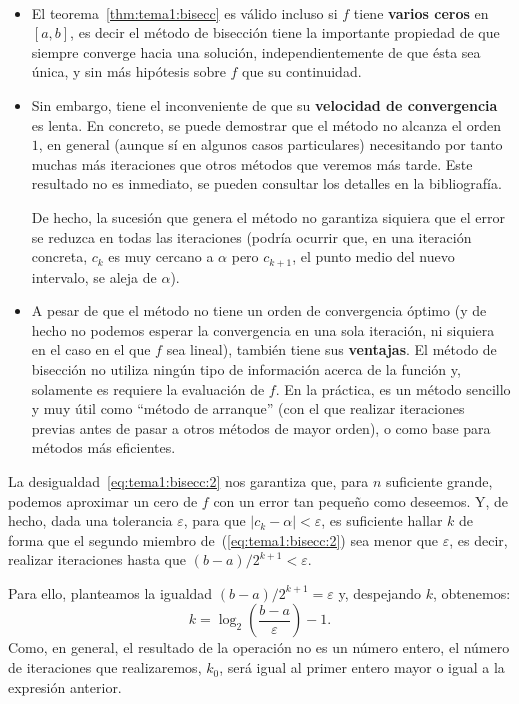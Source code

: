 \begin{remark}
  \label{rk:tema1:unicidad-bisecc}
  ~
  \begin{itemize}
  \item El teorema~\ref{thm:tema1:bisecc} es válido incluso si $f$
    tiene \textbf{varios ceros} en $[a,b]$, es decir el método de
    bisección tiene la importante propiedad de que siempre converge
    hacia una solución, independientemente de que ésta sea única, y
    sin más hipótesis sobre $f$ que su continuidad.
  \item Sin embargo, tiene el inconveniente de que su
    \textbf{velocidad de convergencia} es lenta. En concreto, se puede
    demostrar que el método no alcanza el orden $1$, en general
    (aunque sí en algunos casos particulares) necesitando por tanto
    muchas más iteraciones que otros métodos que veremos más tarde.
    Este resultado no es inmediato, se pueden consultar los detalles
    en la bibliografía.

    De hecho, la sucesión que genera el método no garantiza siquiera
    que el error se reduzca en todas las iteraciones (podría ocurrir
    que, en una iteración concreta, $c_k$ es muy cercano a $\alpha$
    pero $c_{k+1}$, el punto medio del nuevo intervalo, se aleja de
    $\alpha$).


  \item A pesar de que el método no tiene un orden de convergencia
    óptimo (y de hecho no podemos esperar la convergencia en una sola
    iteración, ni siquiera en el caso en el que $f$ sea lineal),
    también tiene sus \textbf{ventajas}. El método de bisección no utiliza
    ningún tipo de información acerca de la función y, solamente es
    requiere la evaluación de $f$. En la práctica, es un método
    sencillo y muy útil como ``método de arranque'' (con el que
    realizar iteraciones previas antes de pasar a otros métodos de
    mayor orden), o como base para métodos más eficientes.
  \end{itemize}
\end{remark}

\begin{remark}
  \label{rk:tema1:bisecc:iteraciones}
  La desigualdad~\eqref{eq:tema1:bisecc:2} nos garantiza que, para $n$
  suficiente grande, podemos aproximar un cero de $f$ con un error tan
  pequeño como deseemos. Y, de hecho, dada una tolerancia
  $\varepsilon$, para que $|c_k-\alpha|<\varepsilon$, es suficiente
  hallar $k$ de forma que el segundo miembro
  de~(\ref{eq:tema1:bisecc:2}) sea menor que $\varepsilon$, es decir,
  realizar iteraciones hasta que $(b-a)/2^{k+1} < \varepsilon$.

  Para ello, planteamos la igualdad $(b-a)/2^{k+1} = \varepsilon$ y, despejando $k$, obtenemos:
  \begin{equation*}
    k=\log_2\left(\frac{b-a}{\varepsilon}\right)-1.
  \end{equation*}
  Como, en general, el resultado de la operación no es un número
  entero, el número de iteraciones que realizaremos, $k_0$, será igual
  al primer entero mayor o igual a la expresión anterior.
\end{remark}

